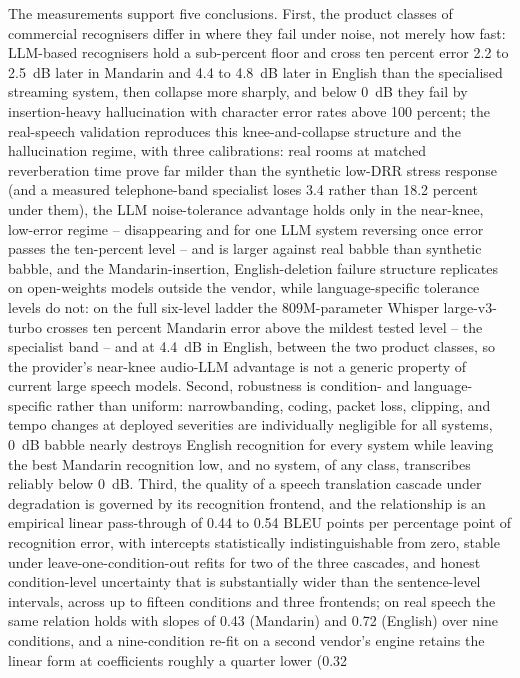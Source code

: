 The measurements support five conclusions. First, the product classes of
commercial recognisers differ in where they fail under noise, not merely how
fast: LLM-based recognisers hold a sub-percent floor and cross ten percent
error 2.2 to 2.5~dB later in Mandarin and 4.4 to 4.8~dB later in English
than the specialised streaming system, then collapse more sharply, and below
0~dB they fail by insertion-heavy hallucination with character error rates
above 100 percent; the real-speech validation reproduces this
knee-and-collapse structure and the hallucination regime, with three
calibrations: real rooms at matched reverberation time prove far milder
than the synthetic low-DRR stress response (and a measured telephone-band
specialist loses 3.4 rather than 18.2 percent under them), the LLM
noise-tolerance advantage holds only in the near-knee, low-error regime --
disappearing and for one LLM system reversing once error passes the
ten-percent level -- and is larger against real babble than synthetic
babble, and the Mandarin-insertion, English-deletion failure structure
replicates on open-weights models outside the vendor, while
language-specific tolerance levels do not: on the full six-level ladder
the 809M-parameter Whisper large-v3-turbo crosses ten percent Mandarin
error above the mildest tested level -- the specialist band -- and at
4.4~dB in English, between the two product classes, so the provider's
near-knee audio-LLM advantage is not a generic property of current large
speech models. Second, robustness is
condition- and language-specific
rather than uniform: narrowbanding, coding, packet loss, clipping, and tempo
changes at deployed severities are individually negligible for all systems,
0~dB babble nearly destroys English recognition for every system while
leaving the best Mandarin recognition low, and no system, of any class,
transcribes reliably below 0~dB. Third, the quality of a speech translation
cascade under degradation is governed by its recognition frontend, and the
relationship is an empirical linear pass-through of 0.44 to 0.54
BLEU points per percentage point of recognition error, with intercepts
statistically indistinguishable from zero, stable under leave-one-condition-out
refits for two of the three cascades, and honest condition-level
uncertainty that is substantially wider than the sentence-level intervals,
across up to fifteen conditions and three frontends; on real speech the
same relation holds with slopes of 0.43 (Mandarin) and 0.72 (English) over
nine conditions, and a nine-condition re-fit on a second vendor's engine
retains the linear form at coefficients roughly a quarter lower (0.32
